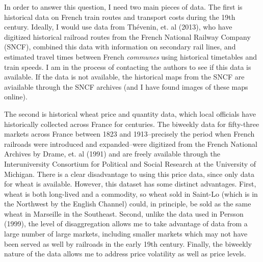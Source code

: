 \documentclass[12pt,twoside]{article}
\begin{document}
In order to answer this question, I need two main pieces of data.
The first is historical data on French train routes and transport costs during the 19th century.
Ideally, I would use data from Th\'{e}venin, et. al (2013), who have digitized historical railroad routes from the French National Railway Company (SNCF), combined this data with information on secondary rail lines, and estimated travel times between French \emph{communes} using historical timetables and train speeds.
I am in the process of contacting the authors to see if this data is available.
If the data is not available, the historical maps from the SNCF are aviailable through the SNCF archives (and I have found images of these maps online).

The second is historical wheat price and quantity data, which local officials have historically collected across France for centuries.
The biweekly data for fifty-three markets across France between 1823 and 1913--precisely the period when French railroads were introduced and expanded--were digitized from the French National Archives by Drame, et. al (1991) and are freely available through the Interuniversity Consortium for Political and Social Research at the University of Michigan.
There is a clear disadvantage to using this price data, since only data for wheat is available.
However, this dataset has some distinct advantages.
First, wheat is both long-lived and a commodity, so wheat sold in Saint-Lo (which is in the Northwest by the English Channel) could, in principle, be sold as the same wheat in Marseille in the Southeast.
Second, unlike the data used in Persson (1999), the level of disaggregation allows me to take advantage of data from a large number of large markets, including smaller markets which may not have been served as well by railroads in the early 19th century.
Finally, the biweekly nature of the data allows me to address price volatility as well as price levels.

\end{document}
